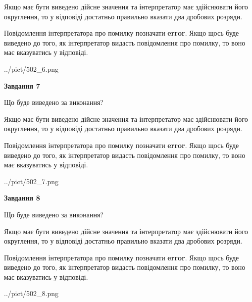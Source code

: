 \documentclass[12pt, ukrainian]{article}
\begin{document}
{\begin {Large}
Якщо має бути виведено дійсне значення та інтерпретатор має здійснювати його округлення, 
то у відповіді достатньо правильно вказати два дробових розряди.

Повідомлення інтерпретатора про помилку позначати \textbf{error}.
Якщо щось буде виведено до того, як інтерпретатор видасть повідомлення про помилку, 
то воно має вказуватись у відповіді. \par

\begin{center}
	{../pict/502_6.png}
\end{center}
\newpage

{\begin {center}\textbf{Завдання 7}\end {center}}\par
Що буде виведено за виконання? \par

Якщо має бути виведено дійсне значення та інтерпретатор має здійснювати його округлення, 
то у відповіді достатньо правильно вказати два дробових розряди.

Повідомлення інтерпретатора про помилку позначати \textbf{error}.
Якщо щось буде виведено до того, як інтерпретатор видасть повідомлення про помилку, 
то воно має вказуватись у відповіді. \par

\begin{center}
	{../pict/502_7.png}
\end{center}
\newpage

{\begin {center}\textbf{Завдання 8}\end {center}}\par
Що буде виведено за виконання? \par

Якщо має бути виведено дійсне значення та інтерпретатор має здійснювати його округлення, 
то у відповіді достатньо правильно вказати два дробових розряди.

Повідомлення інтерпретатора про помилку позначати \textbf{error}.
Якщо щось буде виведено до того, як інтерпретатор видасть повідомлення про помилку, 
то воно має вказуватись у відповіді. \par

\begin{center}
	{../pict/502_8.png}
\end{center}
\newpage


\end{Large}}
\end{document}
